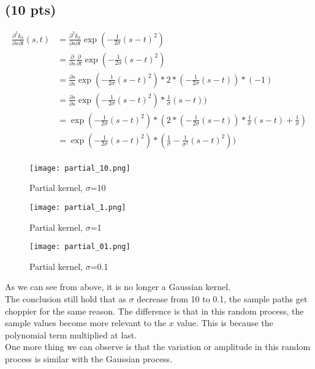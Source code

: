 \documentclass{article}
\begin{document}
\subsection{(10 pts)}
\begin{align}
\frac{\partial^2 k_\sigma}{\partial s\partial t}(s,t) &= \frac{\partial^2 k_\sigma}{\partial s\partial t}\exp(-\tfrac{1}{2\sigma}(s-t)^2)\\
&=\frac{\partial }{\partial s} \frac{\partial}{\partial t} \exp(-\tfrac{1}{2\sigma}(s-t)^2)\\
&=\frac{\partial s}{\partial s} \exp(-\tfrac{1}{2\sigma}(s-t)^2)*2*(-\tfrac{1}{2\sigma}(s-t))*(-1)\\
&=\frac{\partial s}{\partial s} \exp(-\tfrac{1}{2\sigma}(s-t)^2)*\tfrac{1}{\sigma}(s-t))\\
&=\exp(-\tfrac{1}{2\sigma}(s-t)^2)*(2*(-\tfrac{1}{2\sigma}(s-t))*\tfrac{1}{\sigma}(s-t)+\tfrac{1}{\sigma})\\
&=\exp(-\tfrac{1}{2\sigma}(s-t)^2)*(\tfrac{1}{\sigma} -\tfrac{1}{\sigma^2}(s-t)^2))\\
\end{align}
\begin{figure}[h]
	\begin{minipage}[b]{.33\textwidth}\centering
		\texttt{[image: partial\_10.png]}
		\caption{Partial kernel, $\sigma$=10}\label{partial_10}
	\end{minipage}
	\begin{minipage}[b]{.33\textwidth}\centering
		\texttt{[image: partial\_1.png]}
		\caption{Partial kernel, $\sigma$=1}\label{partial_1}
	\end{minipage}
	\begin{minipage}[b]{.33\textwidth}\centering
		\texttt{[image: partial\_01.png]}
		\caption{Partial kernel, $\sigma$=0.1}\label{partial_01}
	\end{minipage}
\end{figure}

As we can see from above, it is no longer a Gaussian kernel.\\
The conclusion still hold that as $\sigma$ decrease from 10 to 0.1, the sample paths get choppier for the same reason. The difference is that in this random process, the sample values become more relevant to the $x$ value. This is because the polynomial term multiplied at last.\\
One more thing we can observe is that the variation or amplitude in this random process is similar with the Gaussian process.
\end{document}
